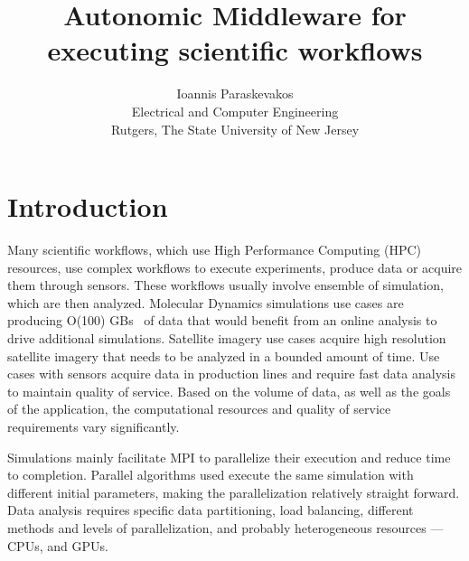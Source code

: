 

\title{Autonomic Middleware for executing scientific workflows}
\author{Ioannis Paraskevakos \\	Electrical and Computer Engineering \\
        Rutgers, The State University of New Jersey}


\maketitle



\section{Introduction}
Many scientific workflows, which use High Performance Computing (HPC) resources, 
use complex workflows to execute experiments, produce data or acquire them through 
sensors. These workflows usually involve ensemble of simulation, which are then 
analyzed. Molecular Dynamics simulations use cases are producing O(100) GBs~\cite{cheatham2015impact} 
of data that would benefit from an online analysis to drive additional simulations. 
Satellite imagery use cases acquire high resolution satellite imagery that needs 
to be analyzed in a bounded amount of time. Use cases with sensors acquire data 
in production lines and require fast data analysis to maintain quality of service. 
Based on the volume of data, as well as the goals of the application, the 
computational resources and quality of service requirements vary significantly. 


Simulations mainly facilitate MPI to parallelize their execution and reduce time 
to completion. Parallel algorithms used execute the same simulation with different 
initial parameters, making the parallelization relatively straight forward. Data 
analysis requires specific data partitioning, load balancing, different methods 
and levels of parallelization, and probably heterogeneous resources --- CPUs, 
and GPUs.

